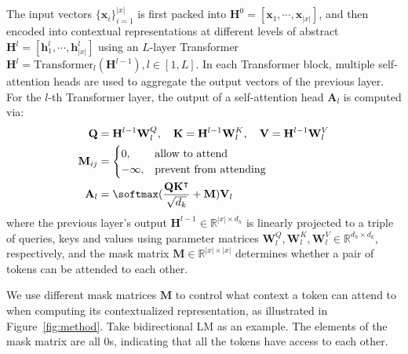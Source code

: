 \documentclass{article}
\begin{document}
The input vectors $\{\textbf{x}_i\}_{i=1}^{|x|}$ is
first packed into $\mathbf{H}^0 = [\mathbf{x}_1, \cdots, \mathbf{x}_{|x|}]$, and then
encoded into contextual representations at different levels of abstract
$\mathbf{H}^l = [\mathbf{h}_1^l, \cdots, \mathbf{h}_{|x|}^l]$ using an $L$-layer Transformer $\mathbf{H}^l = \mathrm{Transformer}_{l}(\mathbf{H}^{l-1}), l \in [1,L]$.
In each Transformer block, multiple self-attention heads are used to aggregate the output vectors of the previous layer.
For the $l$-th Transformer layer, the output of a self-attention head  $\mathbf{A}_l$ is computed via:
\begin{align}
\mathbf{Q} &= \mathbf{H}^{l-1} \mathbf{W}_l^Q ,\quad \mathbf{K} = \mathbf{H}^{l-1} \mathbf{W}_l^K ,\quad \mathbf{V} = \mathbf{H}^{l-1} \mathbf{W}_l^V \\
\mathbf{M}_{ij} &= \begin{cases} 0, &\text{allow to attend} \\ -\infty, &\text{prevent from attending} \end{cases} \label{eq:att:mask} \\
\mathbf{A}_l &= \softmax(\frac{\mathbf{Q} \mathbf{K}^{\intercal}}{ \sqrt{d_k}} + \mathbf{M}) \mathbf{V}_l
\end{align}
where the previous layer's output $\mathbf{H}^{l-1} \in \mathbb{R}^{|x| \times d_h}$ is linearly projected to a triple of queries, keys and values using parameter matrices $\mathbf{W}_l^Q , \mathbf{W}_l^K , \mathbf{W}_l^V \in \mathbb{R}^{d_h \times d_k}$, respectively, and the mask matrix $\mathbf{M} \in \mathbb{R}^{|x| \times |x|} $ determines whether a pair of tokens can be attended to each other.

We use different mask matrices $\mathbf{M}$ to control what context a token can attend to when computing its contextualized representation, as illustrated in Figure~\ref{fig:method}. Take bidirectional LM as an example. The elements of the mask matrix are all $0$s, indicating that all the tokens have access to each other.
\end{document}
